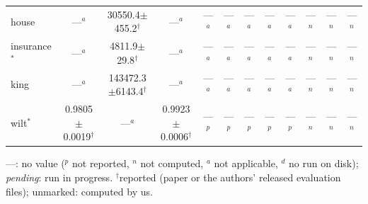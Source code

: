 \begin{table}[t]
{\begin{tabular}{lccccccccccc}
house & ---$^{a}$ & 30550.4{\scriptsize$\pm$455.2}$^\dagger$ & ---$^{a}$ & ---$^{a}$ & ---$^{a}$ & ---$^{a}$ & ---$^{a}$ & ---$^{a}$ & ---$^{n}$ & ---$^{n}$ & ---$^{n}$ \\
insurance$^{*}$ & ---$^{a}$ & 4811.9{\scriptsize$\pm$29.8}$^\dagger$ & ---$^{a}$ & ---$^{a}$ & ---$^{a}$ & ---$^{a}$ & ---$^{a}$ & ---$^{a}$ & ---$^{n}$ & ---$^{n}$ & ---$^{n}$ \\
king & ---$^{a}$ & 143472.3{\scriptsize$\pm$6143.4}$^\dagger$ & ---$^{a}$ & ---$^{a}$ & ---$^{a}$ & ---$^{a}$ & ---$^{a}$ & ---$^{a}$ & ---$^{n}$ & ---$^{n}$ & ---$^{n}$ \\
wilt$^{*}$ & 0.9805{\scriptsize$\pm$0.0019}$^\dagger$ & ---$^{a}$ & 0.9923{\scriptsize$\pm$0.0006}$^\dagger$ & ---$^{p}$ & ---$^{p}$ & ---$^{p}$ & ---$^{p}$ & ---$^{p}$ & ---$^{n}$ & ---$^{n}$ & ---$^{n}$ \\
\bottomrule
\end{tabular}}
\par\smallskip\footnotesize  ---: no value ($^{p}$ not reported, $^{n}$ not computed, $^{a}$ not applicable, $^{d}$ no run on disk); \emph{pending}: run in progress. $^\dagger$reported (paper or the authors' released evaluation files); unmarked: computed by us.
\end{table}
